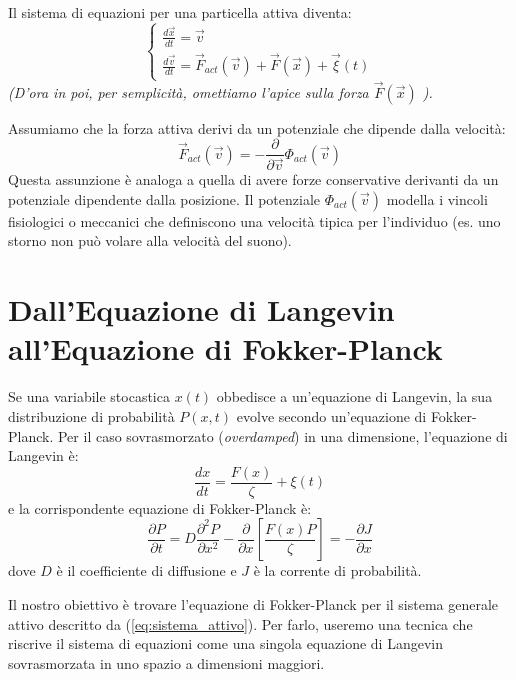 Il sistema di equazioni per una particella attiva diventa:
\begin{equation}
    \begin{cases}
        \frac{d\vec{x}}{dt} = \vec{v} \\
        \frac{d\vec{v}}{dt} = \vec{F}_{act}(\vec{v}) + \vec{F}(\vec{x}) + \vec{\xi}(t)
    \end{cases}
    \label{eq:sistema_attivo}
\end{equation}
\textit{(D'ora in poi, per semplicità, omettiamo l'apice sulla forza $\vec{F}(\vec{x})$ ).}

Assumiamo che la forza attiva derivi da un potenziale che dipende dalla velocità:
\begin{equation}
    \vec{F}_{act}(\vec{v}) = -\frac{\partial}{\partial\vec{v}} \Phi_{act}(\vec{v})
\end{equation}
Questa assunzione è analoga a quella di avere forze conservative derivanti da un potenziale dipendente dalla posizione. Il potenziale $\Phi_{act}(\vec{v})$ modella i vincoli fisiologici o meccanici che definiscono una velocità tipica per l'individuo (es. uno storno non può volare alla velocità del suono).

\section{Dall'Equazione di Langevin all'Equazione di Fokker-Planck}

Se una variabile stocastica $x(t)$ obbedisce a un'equazione di Langevin, la sua distribuzione di probabilità $P(x, t)$ evolve secondo un'equazione di Fokker-Planck. Per il caso sovrasmorzato (\textit{overdamped}) in una dimensione, l'equazione di Langevin è:
\begin{equation}
    \frac{dx}{dt} = \frac{F(x)}{\zeta} + \xi(t)
\end{equation}
e la corrispondente equazione di Fokker-Planck è:
\begin{equation}
    \frac{\partial P}{\partial t} = D \frac{\partial^2 P}{\partial x^2} - \frac{\partial}{\partial x}\left[ \frac{F(x)P}{\zeta} \right] = -\frac{\partial J}{\partial x}
\end{equation}
dove $D$ è il coefficiente di diffusione e $J$ è la corrente di probabilità.

Il nostro obiettivo è trovare l'equazione di Fokker-Planck per il sistema generale attivo descritto da (\ref{eq:sistema_attivo}). Per farlo, useremo una tecnica che riscrive il sistema di equazioni come una singola equazione di Langevin sovrasmorzata in uno spazio a dimensioni maggiori.

